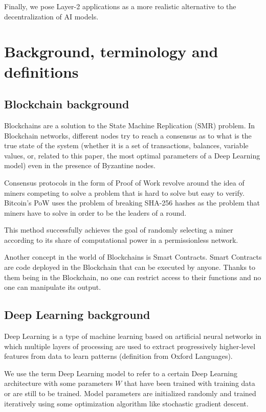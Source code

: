 \documentclass[conference]{IEEEtran}
\begin{document}
    Finally, we pose Layer-2 applications as a more realistic alternative to the decentralization of AI models.
    
    \section{Background, terminology and definitions}
    \subsection{Blockchain background}
    Blockchains are a solution to the State Machine Replication (SMR) problem. In Blockchain networks, different nodes try to reach a consensus as to what is the true state of the system (whether it is a set of transactions, balances, variable values, or, related to this paper, the most optimal parameters of a Deep Learning model) even in the presence of Byzantine nodes.
    
    Consensus protocols in the form of Proof of Work revolve around the idea of miners competing to solve a problem that is hard to solve but easy to verify. Bitcoin's PoW uses the problem of breaking SHA-256 hashes as the problem that miners have to solve in order to be the leaders of a round.
    
    This method successfully achieves the goal of randomly selecting a miner according to its share of computational power in a permissionless network.
    
    Another concept in the world of Blockchains is Smart Contracts. Smart Contracts are code deployed in the Blockchain that can be executed by anyone. Thanks to them being in the Blockchain, no one can restrict access to their functions and no one can manipulate its output.
    
    \subsection{Deep Learning background}
    Deep Learning is a type of machine learning based on artificial neural networks in which multiple layers of processing are used to extract progressively higher-level features from data to learn patterns (definition from Oxford Languages).
    
    We use the term Deep Learning model to refer to a certain Deep Learning architecture with some parameters $W$ that have been trained with training data or are still to be trained. Model parameters are initialized randomly and trained iteratively using some optimization algorithm like stochastic gradient descent.
    
\end{document}
